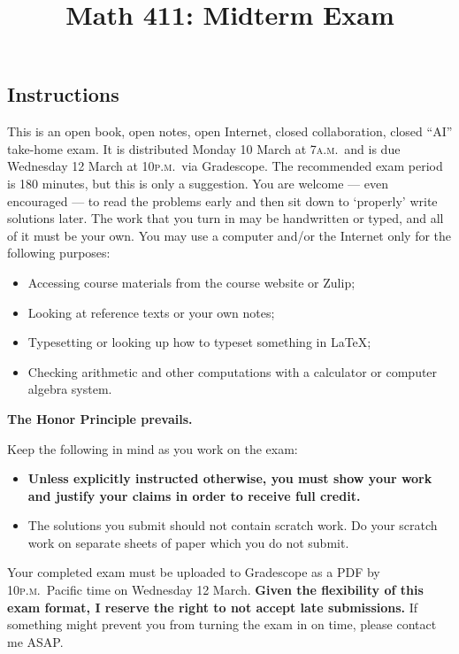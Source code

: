 \documentclass[11pt,twoside]{amsart}
\title{Math 411: Midterm Exam}
\theoremstyle{plain}
\theoremstyle{remark}
\theoremstyle{definition}
\theoremstyle{definition}
\begin{document}
\maketitle

\subsection*{Instructions}
This is an open book, open notes, open Internet, closed collaboration, closed ``AI'' take-home exam. It is distributed Monday 10 March at 7\textsc{a.m.}~and is due Wednesday 12 March at 10\textsc{p.m.}~via Gradescope. The recommended exam period is 180 minutes, but this is only a suggestion. You are welcome --- even encouraged --- to read the problems early and then sit down to `properly' write solutions later. The work that you turn in may be handwritten or typed, and all of it must be your own. You may use a computer and/or the Internet only for the following purposes:
\begin{itemize}
\item Accessing course materials from the course website or Zulip;
\item Looking at reference texts or your own notes;
\item Typesetting or looking up how to typeset something in \LaTeX;
\item Checking arithmetic and other computations with a calculator or computer algebra system.
\end{itemize}
\textbf{The Honor Principle prevails.}

\bigskip

\noindent Keep the following in mind as you work on the exam:
\begin{itemize}
    \setlength{\itemsep}{0.3\baselineskip}
  \item \textbf{Unless explicitly instructed otherwise, you must show your work and
justify your claims in order to receive full credit.} 
  \item The solutions you submit should not contain scratch work. Do your
    scratch work on separate sheets of paper which you do not submit.
\end{itemize}
\bigskip

\noindent Your completed exam must be uploaded to Gradescope as a PDF by
10\textsc{p.m.}~Pacific time on Wednesday 12 March.  \textbf{Given the flexibility of this exam format, I reserve the right to not accept late submissions.}  If something might prevent you from turning the exam in on time, please contact me ASAP.
\end{document}
